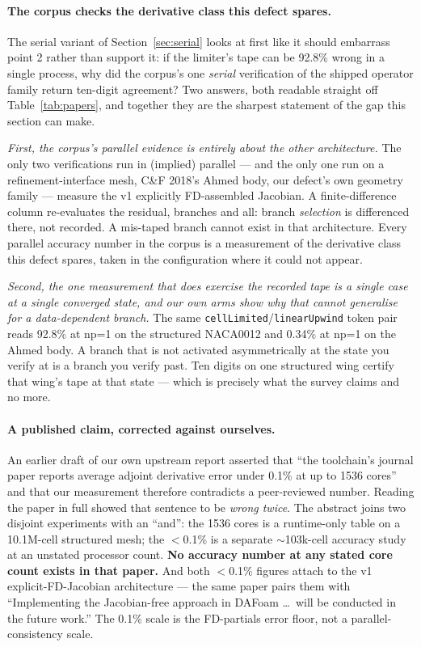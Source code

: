 \documentclass[11pt,a4paper]{article}
\begin{document}
\paragraph{The corpus checks the derivative class this defect spares.} The serial variant of
Section~\ref{sec:serial} looks at first like it should embarrass point 2 rather than support
it: if the limiter's tape can be 92.8\% wrong in a single process, why did the corpus's one
\emph{serial} verification of the shipped operator family return ten-digit agreement? Two
answers, both readable straight off Table~\ref{tab:papers}, and together they are the sharpest
statement of the gap this section can make.

\emph{First, the corpus's parallel evidence is entirely about the other architecture.} The
only two verifications run in (implied) parallel --- and the only one run on a
refinement-interface mesh, C\&F 2018's Ahmed body, our defect's own geometry family --- measure
the v1 explicitly FD-assembled Jacobian. A finite-difference column re-evaluates the residual,
branches and all: branch \emph{selection} is differenced there, not recorded. A mis-taped
branch cannot exist in that architecture. Every parallel accuracy number in the corpus is a
measurement of the derivative class this defect spares, taken in the configuration where it
could not appear.

\emph{Second, the one measurement that does exercise the recorded tape is a single case at a
single converged state, and our own arms show why that cannot generalise for a data-dependent
branch.} The same \texttt{cellLimited}/\texttt{linearUpwind} token pair reads 92.8\% at np=1 on
the structured NACA0012 and 0.34\% at np=1 on the Ahmed body. A branch that is not activated
asymmetrically at the state you verify at is a branch you verify past. Ten digits on one
structured wing certify that wing's tape at that state --- which is precisely what the survey
claims and no more.

\paragraph{A published claim, corrected against ourselves.} An earlier draft of our own
upstream report asserted that ``the toolchain's journal paper reports average adjoint
derivative error under 0.1\% at up to 1536 cores'' and that our measurement therefore
contradicts a peer-reviewed number. Reading the paper in full showed that sentence to be
\emph{wrong twice}. The abstract joins two disjoint experiments with an ``and'': the 1536
cores is a runtime-only table on a 10.1M-cell structured mesh; the \(<\)0.1\% is a separate
\(\sim\)103k-cell accuracy study at an unstated processor count. \textbf{No accuracy number at
any stated core count exists in that paper.} And both \(<\)0.1\% figures attach to the v1
explicit-FD-Jacobian architecture --- the same paper pairs them with ``Implementing the
Jacobian-free approach in DAFoam \ldots\ will be conducted in the future work.'' The 0.1\%
scale is the FD-partials error floor, not a parallel-consistency scale.
\end{document}
